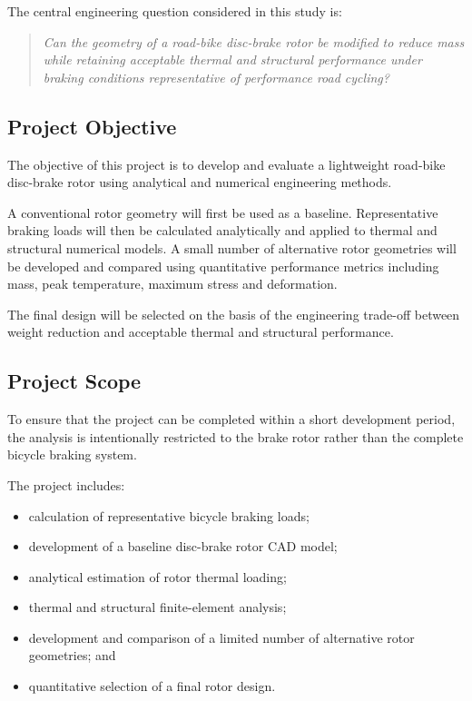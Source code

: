 \documentclass[11pt,a4paper]{article}
\begin{document}
The central engineering question considered in this study is:

\begin{quote}
\textit{Can the geometry of a road-bike disc-brake rotor be modified to reduce
mass while retaining acceptable thermal and structural performance under
braking conditions representative of performance road cycling?}
\end{quote}


\subsection{Project Objective}

The objective of this project is to develop and evaluate a lightweight
road-bike disc-brake rotor using analytical and numerical engineering methods.

A conventional rotor geometry will first be used as a baseline. Representative
braking loads will then be calculated analytically and applied to thermal and
structural numerical models. A small number of alternative rotor geometries will
be developed and compared using quantitative performance metrics including mass,
peak temperature, maximum stress and deformation.

The final design will be selected on the basis of the engineering trade-off
between weight reduction and acceptable thermal and structural performance.


\subsection{Project Scope}

To ensure that the project can be completed within a short development period,
the analysis is intentionally restricted to the brake rotor rather than the
complete bicycle braking system.

The project includes:

\begin{itemize}[noitemsep]
    \item calculation of representative bicycle braking loads;
    \item development of a baseline disc-brake rotor CAD model;
    \item analytical estimation of rotor thermal loading;
    \item thermal and structural finite-element analysis;
    \item development and comparison of a limited number of alternative rotor
    geometries; and
    \item quantitative selection of a final rotor design.
\end{itemize}
\end{document}
